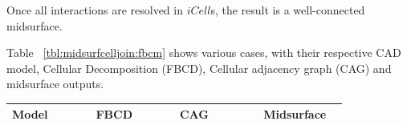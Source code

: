 Once all interactions are resolved in $iCell$s, the result is a well-connected midsurface. 

Table ~\ref{tbl:midsurfcelljoin:fbcm} shows various cases, with their respective CAD model, Cellular Decomposition (FBCD), Cellular adjacency graph (CAG) and midsurface outputs.

	


\newcommand \myColWidthFactora {0.22}
\begin{center}
\label{tbl:midsurfcelljoin:fbcm}
\begin{longtable}[!htb]{@{}p{\myColWidthFactora\linewidth} p{\myColWidthFactora\linewidth}  p{\myColWidthFactora\linewidth}  p{\myColWidthFactora\linewidth} @{}} \toprule
{\bf Model} & {\bf FBCD}  & {\bf CAG} & {\bf Midsurface} \\ \midrule  


\end{longtable}
\end{center}
